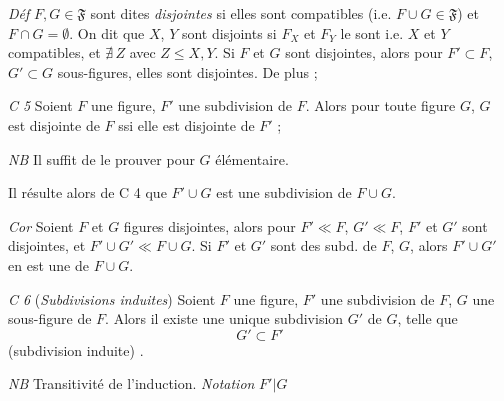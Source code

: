 \documentclass[11pt,a4paper]{article}
\begin{document}
\emph{Déf} \quad $F, G \in \mathfrak{F}$ sont dites \emph{disjointes} si elles sont compatibles (i.e. $F \cup G \in \mathfrak{F}$) et $F \cap G = \emptyset$. On dit que $X$, $Y$ sont disjoints si $F_X$ et $F_Y$ le sont i.e. $X$ et $Y$ compatibles, et $\nexists\, Z$ avec $Z \leq X, Y$. Si $F$ et $G$ sont disjointes, alors pour $F' \subset F$, $G' \subset G$ sous-figures, elles sont disjointes. De plus ;



\emph{C 5} \quad Soient $F$ une figure, $F'$ une subdivision de $F$. Alors pour toute figure $G$, $G$ est disjointe de $F$ ssi elle est disjointe de $F'$ ;

\emph{NB} Il suffit de le prouver pour $G$ élémentaire.

Il résulte alors de  C 4 que $F' \cup G$ est une subdivision de $F \cup G$.

\emph{Cor} \quad Soient $F$ et $G$ figures disjointes, alors pour $F' \ll F$, $G' \ll F$, $F'$ et $G'$ sont disjointes, et $F' \cup G' \ll F \cup G$. Si $F'$ et $G'$ sont des subd. de $F$, $G$, alors $F' \cup G'$ en est une de $F \cup G$.

\emph{C 6} (\emph{Subdivisions induites}) \quad Soient $F$ une figure, $F'$ une subdivision de $F$, $G$ une sous-figure de $F$. Alors il existe une unique subdivision $G'$ de $G$, telle que
\[
  G' \subset F'
\]
(subdivision induite) .

\emph{NB} Transitivité de l'induction. \emph{Notation} $F'|G$
\end{document}

